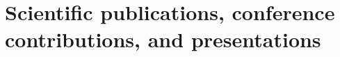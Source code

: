 \documentclass[11pt,titlepage]{article}
\begin{document}
\section{Scientific publications, conference contributions, and presentations}

\nocite{Wicaksono2014a}
\nocite{Wicaksono2014b}
\nocite{Wicaksono2014c}
\nocite{Wicaksono2014d}
\nocite{Wicaksono2014e}
\printbibliography[heading=none]

\end{document}
